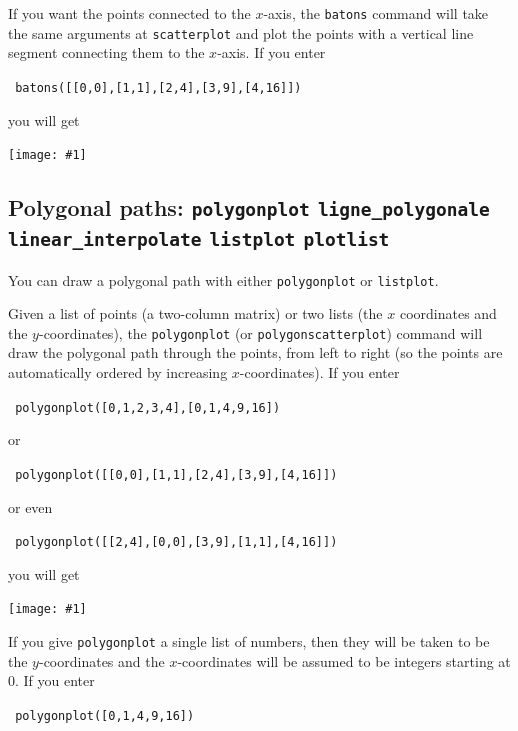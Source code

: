 \documentclass[a4paper,11pt]{book}
\newcommand{\includeimage}[1]
{\texttt{[image: \#1]}}
\begin{document}
If you want the points connected to the $x$-axis, the \texttt{batons}
command will take the same arguments at \texttt{scatterplot} and plot
the points with a vertical line segment connecting them to the
$x$-axis.  If you enter
\begin{center}
  \tt
  batons([[0,0],[1,1],[2,4],[3,9],[4,16]])
\end{center}
you will get
\begin{center}
  \includeimage{xcas-batons.png}
\end{center}

\subsection{Polygonal paths: \texttt{polygonplot}
\texttt{ligne\_polygonale}
\texttt{linear\_interpolate}  
\texttt{listplot} \texttt{plotlist}}

You can draw a polygonal path with either \texttt{polygonplot} or
\texttt{listplot}.  

Given a list of points (a two-column matrix) or two lists (the $x$
coordinates and the $y$-coordinates), the \texttt{polygonplot} (or
\texttt{polygonscatterplot}) command
will draw the polygonal path through the points, from left to right
(so the points are automatically ordered by increasing
$x$-coordinates).  If you enter
\begin{center}
  \tt
  polygonplot([0,1,2,3,4],[0,1,4,9,16])
\end{center}
or
\begin{center}
  \tt
  polygonplot([[0,0],[1,1],[2,4],[3,9],[4,16]])
\end{center}
or even
\begin{center}
  \tt
  polygonplot([[2,4],[0,0],[3,9],[1,1],[4,16]])
\end{center}
you will get
\begin{center}
  \includeimage{xcas-polygonplot.png}
\end{center}

If you give \texttt{polygonplot} a single list of numbers, then they will
be taken to be the $y$-coordinates and the $x$-coordinates will be
assumed to be integers starting at $0$.  If you enter
\begin{center}
  \tt
  polygonplot([0,1,4,9,16])
\end{center}
\end{document}
